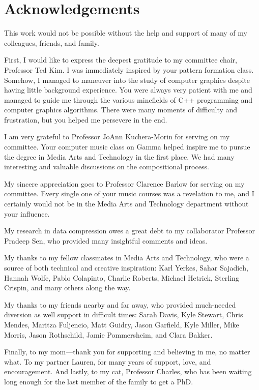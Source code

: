 \chapter*{Acknowledgements}

{\singlespace
This work would not be possible without the help and support of many of my colleagues, friends, and family.

First, I would like to express the deepest gratitude to my committee chair, Professor Ted Kim. I was immediately inspired by your pattern formation class. Somehow, I managed to maneuver into the study of computer graphics despite having little background experience. You were always very patient with me and managed to guide me through the various minefields of C++ programming and computer graphics algorithms. There were many moments of difficulty and frustration, but you helped me persevere in the end.

I am very grateful to Professor JoAnn Kuchera-Morin for serving on my committee. Your computer music class on Gamma helped inspire me to pursue the degree in Media Arts and Technology in the first place. We had many interesting and valuable discussions on the compositional process. 

My sincere appreciation goes to Professor Clarence Barlow for serving on my committee. Every single one of your music courses was a revelation to me, and I certainly would not be in the Media Arts and Technology department without your influence. 

My research in data compression owes a great debt to my collaborator Professor Pradeep Sen, who provided many insightful comments and ideas.

My thanks to my fellow classmates in Media Arts and Technology, who were a source of both technical and creative inspiration: Karl Yerkes, Sahar Sajadieh, Hannah Wolfe, Pablo Colapinto, Charlie Roberts, Michael Hetrick, Sterling Crispin, and many others along the way.

My thanks to my friends nearby and far away, who provided much-needed diversion as well support in difficult times: Sarah Davis, Kyle Stewart, Chris Mendes, Maritza Fuljencio, Matt Guidry, Jason Garfield, Kyle Miller, Mike Morris, 
Jason Rothschild, Jamie Pommersheim, and Clara Bakker.

Finally, to my mom---thank you for supporting and believing in me, no matter what. To my partner Lauren, for many years of support, love, and encouragement. And lastly, to my cat, Professor Charles, who has been waiting long enough for the last member of the family to get a PhD.
}

